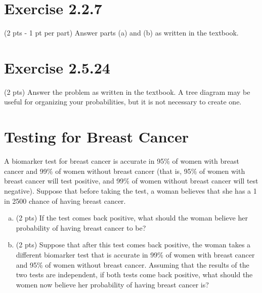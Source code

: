 \documentclass{article}
\begin{document}
\section{Exercise 2.2.7}
(2 pts - 1 pt per part) Answer parts (a) and (b) as written in the textbook.


\section{Exercise 2.5.24}
(2 pts) Answer the problem as written in the textbook. A tree diagram may be useful for organizing your probabilities, but it is not necessary to create one.

\section{Testing for Breast Cancer}

A biomarker test for breast cancer is accurate in 95\% of women with breast cancer and 99\% of women without breast cancer (that is, 95\% of women with breast cancer will test positive, and 99\% of women without breast cancer will test negative). Suppose that before taking the test, a woman believes that she has a 1 in 2500 chance of having breast cancer.

\begin{enumerate}[(a)]
\item (2 pts) If the test comes back positive, what should the woman believe her probability of having breast cancer to be?
\item (2 pts) Suppose that after this test comes back positive, the woman takes a different biomarker test that is accurate in 99\% of women with breast cancer and 95\% of women without breast cancer. Assuming that the results of the two tests are independent, if both tests come back positive, what should the women now believe her probability of having breast cancer is?
\end{enumerate}
\end{document}
